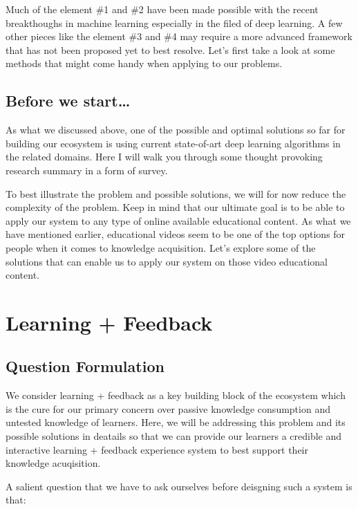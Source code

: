 \documentclass[]{book}
\theoremstyle{definition}
\theoremstyle{definition}
\theoremstyle{definition}
\theoremstyle{remark}
\begin{document}
Much of the element \#1 and \#2 have been made possible with the recent
breakthoughs in machine learning especially in the filed of deep
learning. A few other pieces like the element \#3 and \#4 may require a
more advanced framework that has not been proposed yet to best resolve.
Let's first take a look at some methods that might come handy when
applying to our problems.

\subsection{Before we start\ldots{}}\label{before-we-start}

As what we discussed above, one of the possible and optimal solutions so
far for building our ecosystem is using current state-of-art deep
learning algorithms in the related domains. Here I will walk you through
some thought provoking research summary in a form of survey.

To best illustrate the problem and possible solutions, we will for now
reduce the complexity of the problem. Keep in mind that our ultimate
goal is to be able to apply our system to any type of online available
educational content. As what we have mentioned earlier, educational
videos seem to be one of the top options for people when it comes to
knowledge acquisition. Let's explore some of the solutions that can
enable us to apply our system on those video educational content.

\section{Learning + Feedback}\label{learning-feedback}

\subsection{Question Formulation}\label{question-formulation}

We consider learning + feedback as a key building block of the ecosystem
which is the cure for our primary concern over passive knowledge
consumption and untested knowledge of learners. Here, we will be
addressing this problem and its possible solutions in deatails so that
we can provide our learners a credible and interactive learning +
feedback experience system to best support their knowledge acuqisition.

A salient question that we have to ask ourselves before deisgning such a
system is that:
\end{document}
